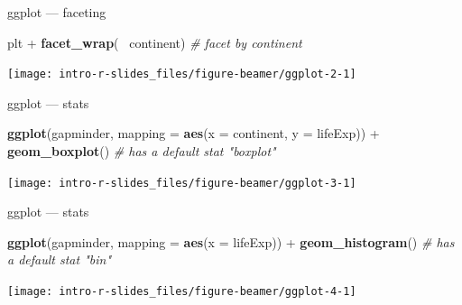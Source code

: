 \documentclass[10pt,ignorenonframetext,compress, aspectratio=169]{beamer}
\newenvironment{Shaded}{\begin{snugshade}}{\end{snugshade}}
\newcommand{\KeywordTok}[1]{\textcolor[rgb]{0.13,0.29,0.53}{\textbf{{#1}}}}
\newcommand{\DataTypeTok}[1]{\textcolor[rgb]{0.13,0.29,0.53}{{#1}}}
\newcommand{\StringTok}[1]{\textcolor[rgb]{0.31,0.60,0.02}{{#1}}}
\newcommand{\CommentTok}[1]{\textcolor[rgb]{0.56,0.35,0.01}{\textit{{#1}}}}
\newcommand{\NormalTok}[1]{{#1}}
\begin{document}
\begin{frame}[fragile]{ggplot --- faceting}

\scriptsize

\begin{Shaded}
\begin{Highlighting}[]
\NormalTok{plt +}\StringTok{ }\KeywordTok{facet_wrap}\NormalTok{(~}\StringTok{ }\NormalTok{continent)  }\CommentTok{# facet by continent}
\end{Highlighting}
\end{Shaded}

\begin{center}\texttt{[image: intro-r-slides\_files/figure-beamer/ggplot-2-1]} \end{center}

\normalsize

\end{frame}

\begin{frame}[fragile]{ggplot --- stats}

\scriptsize

\begin{Shaded}
\begin{Highlighting}[]
\KeywordTok{ggplot}\NormalTok{(gapminder, }\DataTypeTok{mapping =} \KeywordTok{aes}\NormalTok{(}\DataTypeTok{x =} \NormalTok{continent, }\DataTypeTok{y =} \NormalTok{lifeExp)) +}
\StringTok{    }\KeywordTok{geom_boxplot}\NormalTok{()                      }\CommentTok{# has a default stat "boxplot"}
\end{Highlighting}
\end{Shaded}

\begin{center}\texttt{[image: intro-r-slides\_files/figure-beamer/ggplot-3-1]} \end{center}

\normalsize

\end{frame}

\begin{frame}[fragile]{ggplot --- stats}

\scriptsize

\begin{Shaded}
\begin{Highlighting}[]
\KeywordTok{ggplot}\NormalTok{(gapminder, }\DataTypeTok{mapping =} \KeywordTok{aes}\NormalTok{(}\DataTypeTok{x =} \NormalTok{lifeExp)) +}
\StringTok{    }\KeywordTok{geom_histogram}\NormalTok{()                      }\CommentTok{# has a default stat "bin"}
\end{Highlighting}
\end{Shaded}

\begin{center}\texttt{[image: intro-r-slides\_files/figure-beamer/ggplot-4-1]} \end{center}

\normalsize

\end{frame}
\end{document}
